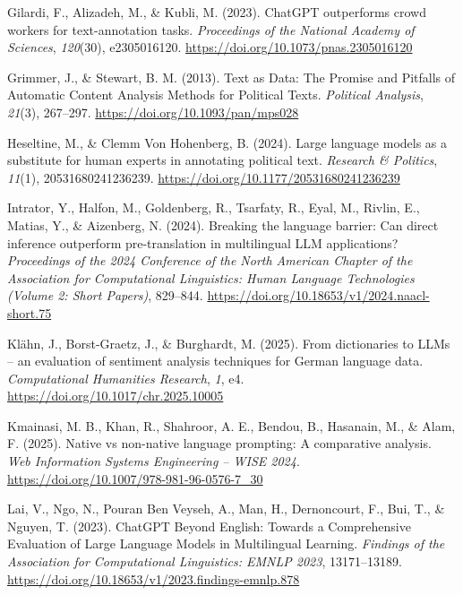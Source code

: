 \documentclass[
  man,
  floatsintext,
  longtable,
  nolmodern,
  notxfonts,
  notimes,
  colorlinks=true,linkcolor=blue,citecolor=blue,urlcolor=blue]{apa7}
\newlength{\cslhangindent}
\newenvironment{CSLReferences}[2] %
 {\begin{list}{}{%
  \setlength{\itemindent}{0pt}
  \setlength{\leftmargin}{0pt}
  \setlength{\parsep}{0pt}
  \ifodd #1
   \setlength{\leftmargin}{\cslhangindent}
   \setlength{\itemindent}{-1\cslhangindent}
  \fi
  \setlength{\itemsep}{#2\baselineskip}}}
 {\end{list}}
\begin{document}
\begin{CSLReferences}{1}{0}
Gilardi, F., Alizadeh, M., \& Kubli, M. (2023). {ChatGPT} outperforms
crowd workers for text-annotation tasks. \emph{Proceedings of the
National Academy of Sciences}, \emph{120}(30), e2305016120.
\url{https://doi.org/10.1073/pnas.2305016120}

Grimmer, J., \& Stewart, B. M. (2013). Text as {Data}: {The Promise} and
{Pitfalls} of {Automatic Content Analysis Methods} for {Political
Texts}. \emph{Political Analysis}, \emph{21}(3), 267--297.
\url{https://doi.org/10.1093/pan/mps028}

Heseltine, M., \& Clemm Von Hohenberg, B. (2024). Large language models
as a substitute for human experts in annotating political text.
\emph{Research \& Politics}, \emph{11}(1), 20531680241236239.
\url{https://doi.org/10.1177/20531680241236239}

Intrator, Y., Halfon, M., Goldenberg, R., Tsarfaty, R., Eyal, M.,
Rivlin, E., Matias, Y., \& Aizenberg, N. (2024). Breaking the language
barrier: Can direct inference outperform pre-translation in multilingual
{LLM} applications? \emph{Proceedings of the 2024 Conference of the
North American Chapter of the Association for Computational Linguistics:
Human Language Technologies (Volume 2: Short Papers)}, 829--844.
\url{https://doi.org/10.18653/v1/2024.naacl-short.75}

Klähn, J., Borst-Graetz, J., \& Burghardt, M. (2025). From dictionaries
to {LLMs} -- an evaluation of sentiment analysis techniques for {German}
language data. \emph{Computational Humanities Research}, \emph{1}, e4.
\url{https://doi.org/10.1017/chr.2025.10005}

Kmainasi, M. B., Khan, R., Shahroor, A. E., Bendou, B., Hasanain, M., \&
Alam, F. (2025). Native vs non-native language prompting: A comparative
analysis. \emph{Web Information Systems Engineering -- WISE 2024}.
\url{https://doi.org/10.1007/978-981-96-0576-7_30}

Lai, V., Ngo, N., Pouran Ben Veyseh, A., Man, H., Dernoncourt, F., Bui,
T., \& Nguyen, T. (2023). {ChatGPT Beyond English}: {Towards} a
{Comprehensive Evaluation} of {Large Language Models} in {Multilingual
Learning}. \emph{Findings of the {Association} for {Computational
Linguistics}: {EMNLP} 2023}, 13171--13189.
\url{https://doi.org/10.18653/v1/2023.findings-emnlp.878}


\end{CSLReferences}
\end{document}
